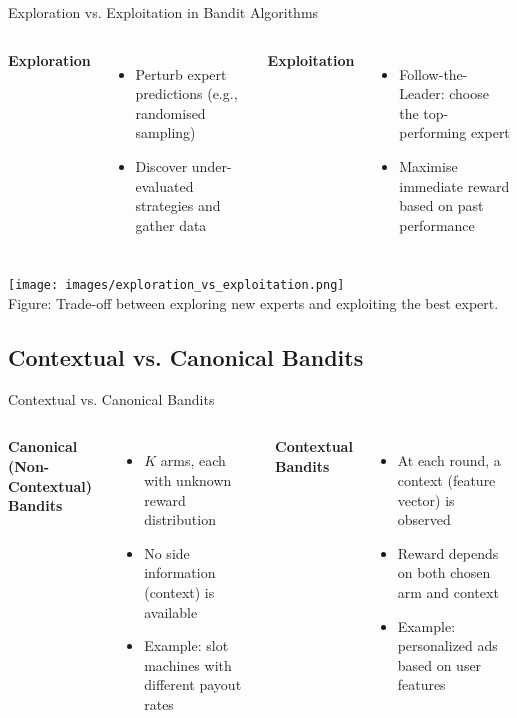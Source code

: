 \documentclass{beamer}
\begin{document}
\begin{frame}{Exploration vs. Exploitation in Bandit Algorithms}
  \begin{columns}[T,onlytextwidth]
    \textbf{Exploration}
      \begin{itemize}
        \item {Perturb expert predictions (e.g., randomised sampling)}
        \item {Discover under-evaluated strategies and gather data}
      \end{itemize}
    \textbf{Exploitation}
      \begin{itemize}
        \item {Follow-the-Leader: choose the top-performing expert}
        \item { Maximise immediate reward based on past performance}
      \end{itemize}
  \end{columns}

  \vspace{1em}
  \begin{center}
    \texttt{[image: images/exploration\_vs\_exploitation.png]}\\
    {\small Figure: Trade-off between exploring new experts and exploiting the best expert.}
  \end{center}
\end{frame}


\subsection{Contextual vs. Canonical Bandits}

\begin{frame}{Contextual vs. Canonical Bandits}
  \begin{columns}[T,onlytextwidth]
    \textbf{Canonical (Non-Contextual) Bandits}
      \begin{itemize}
        \item $K$ arms, each with unknown reward distribution
        \item No side information (context) is available
        \item Example: slot machines with different payout rates
      \end{itemize}
    \textbf{Contextual Bandits}
      \begin{itemize}
        \item At each round, a context (feature vector) is observed
        \item Reward depends on both chosen arm and context
        \item Example: personalized ads based on user features
      \end{itemize}
  \end{columns}
\end{frame}
\end{document}
